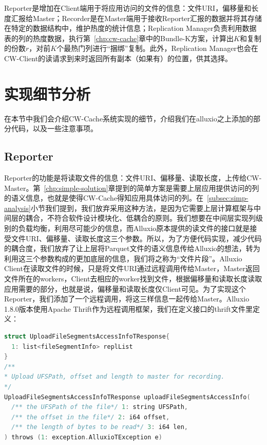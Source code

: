 \par Reporter是增加在Client端用于将应用访问的文件的信息：文件URI，偏移量和长度汇报给Master；Recorder是在Master端用于接收Reporter汇报的数据并将其存储在特定的数据结构中，维护热度的统计信息；Replication Manager负责利用数据表的列的热度数据，执行第~\ref{chp:cw-cache}章中的Bundle-K方案，计算出$K$和复制的份数$r$，对前$K$个最热门列进行“捆绑”复制。此外，Replication Manager也会在CW-Client的读请求到来时返回所有副本（如果有）的位置，供其选择。

\section{实现细节分析}
\label{sec:impl-details}

\par 在本节中我们会介绍CW-Cache系统实现的细节，介绍我们在alluxio之上添加的部分代码，以及一些注意事项。

\subsection{Reporter}

\par Reporter的功能是将读取文件的信息：文件URI、偏移量、读取长度，上传给CW-Master。第~\ref{chp:simple-solution}章提到的简单方案是需要上层应用提供访问的列的语义信息，也就是使得CW-Cache得知应用具体访问的列。在~\ref{subsec:simp-analysis}小节我们提到，我们放弃采用这种方法，是因为它需要上层计算框架与中间层的耦合，不符合软件设计模块化、低耦合的原则。我们想要在中间层实现列级别的负载均衡，利用尽可能少的信息，而Alluxio原本提供的读文件的接口就是接受文件URI、偏移量、读取长度这三个参数。所以，为了方便代码实现，减少代码的耦合度，我们放弃了让上层将Parquet文件的语义信息传给Alluxio的想法，转为利用这三个参数构成的更加底层的信息，我们将之称为“文件片段”。Alluxio Client在读取文件的时候，只是将文件URI通过远程调用传给Master，Master返回文件所在的workers，Client去相应的worker找到文件，根据偏移量和读取长度读取应用需要的部分，也就是说，偏移量和读取长度仅Client可见。为了实现这个Reporter，我们添加了一个远程调用，将这三样信息一起传给Master。Alluxio 1.8.0版本使用Apache Thrift作为远程调用框架，我们在定义接口的thrift文件里定义：

\begin{lstlisting}[language=c]
struct UploadFileSegmentsAccessInfoTResponse{
  1: list<fileSegmentInfo> replList
}
/**
* Upload UFSPath, offset and length to master for recording.
*/
UploadFileSegmentsAccessInfoTResponse uploadFileSegmentsAccessInfo(
  /** the UFSPath of the file*/ 1: string UFSPath,
  /** the offset in the file*/ 2: i64 offset,
  /** the length of bytes to be read*/ 3: i64 len,
) throws (1: exception.AlluxioTException e)
\end{lstlisting}



